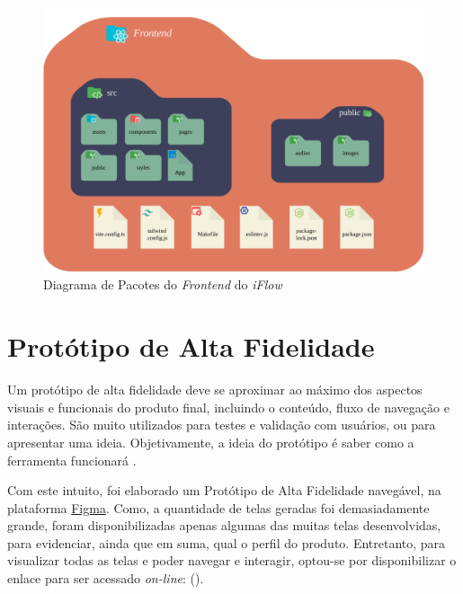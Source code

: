 \begin{figure}[]
    \begin{center}
        \caption{{Diagrama de Pacotes do \textit{Frontend} do \textit{iFlow}}}
        \label{fig:pacotes_frontend}
        \includegraphics[scale=0.58]{figuras/Proposta/Diagrama_de_Pacotes-Frontend.png}
    \end{center}
\end{figure}

\section{Protótipo de Alta Fidelidade}

\label{sec:prototipo_de_alta_fidelidade}

Um protótipo de alta fidelidade deve se aproximar ao máximo dos aspectos visuais e funcionais do produto final, incluindo o conteúdo, fluxo de navegação e interações. São muito utilizados para testes e validação com usuários, ou para apresentar uma ideia. Objetivamente, a ideia do protótipo é saber como a ferramenta funcionará \cite{hf_prototype}.

Com este intuito, foi elaborado um Protótipo de Alta Fidelidade navegável, na plataforma \href{https://www.figma.com/}{Figma}. Como, a quantidade de telas geradas foi demasiadamente grande, foram disponibilizadas apenas algumas das muitas telas desenvolvidas, para evidenciar, ainda que em suma, qual o perfil do produto. Entretanto, para visualizar todas as telas e poder navegar e interagir, optou-se por disponibilizar o enlace para ser acessado \textit{on-line}:  (\citeyear{prototipo_alta_fidelidade}).

